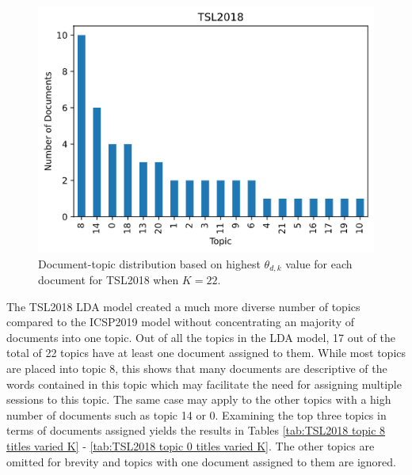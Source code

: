 \documentclass[a4paper, 12pt, twoside]{article}
\numberwithin{equation}{section} %
\begin{document}
\begin{figure}[H]

  \centering
  \includegraphics[width=0.65\linewidth]{TSL_placement.png}
\caption[TSL2018 varied K document-topic distribution]{Document-topic distribution based on highest $\theta_{d,k}$ value for each document for TSL2018 when $K=22$.}
\label{fig:TSL2018 varied K placements}
\end{figure}

The TSL2018 LDA model created a much more diverse number of topics compared to the ICSP2019 model without concentrating an majority of documents into one topic. Out of all the topics in the LDA model, 17 out of the total of 22 topics have at least one document assigned to them. While most topics are placed into topic 8, this shows that many documents are descriptive of the words contained in this topic which may facilitate the need for assigning multiple sessions to this topic. The same case may apply to the other topics with a high number of documents such as topic 14 or 0. Examining the top three topics in terms of documents assigned yields the results in Tables \ref{tab:TSL2018 topic 8 titles varied K} - \ref{tab:TSL2018 topic 0 titles varied K}. The other topics are omitted for brevity and topics with one document assigned to them are ignored.
\end{document}
